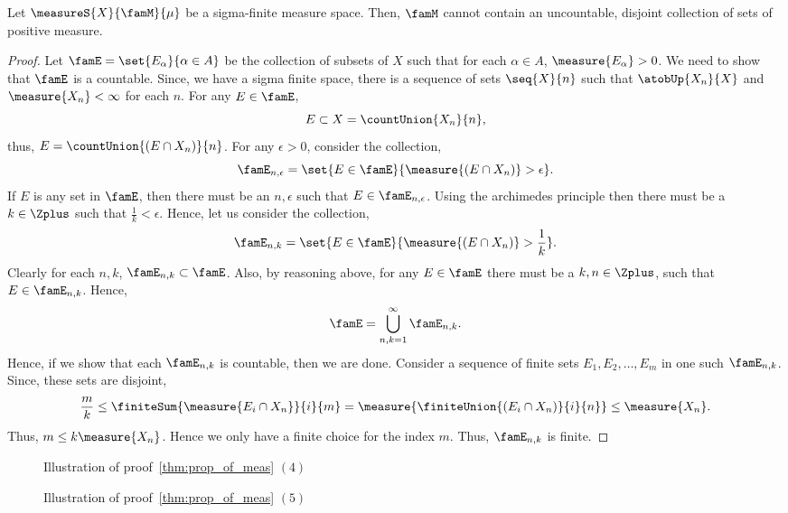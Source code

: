 \begin{Theorem}
    Let $\measureS{X}{\famM}{\mu}$ be a sigma-finite measure space. Then, $\famM$ cannot contain an
    uncountable, disjoint collection of sets of positive measure.
\end{Theorem}
\begin{proof}
    Let $\famE = \set{E_{\alpha}}{\alpha \in A}$ be the collection of subsets of $X$ such that for each
    $\alpha \in A$, $\measure{E_{\alpha}} > 0$. We need to show that $\famE$ is a countable. Since, we have a
    sigma finite space, there is a sequence of sets $\seq{X}{n}$ such that $\atobUp{X_n}{X}$ and 
    $\measure{X_n} < \infty$ for each $n$. For any $E \in \famE$,
    \[E \subset X = \countUnion{X_n}{n},\]
    thus, $E = \countUnion{(E\cap X_n)}{n}$.
    For any $\epsilon > 0$, consider the collection,
    \[\famE_{n,\epsilon} = \set{E \in \famE}{\measure{(E\cap X_n)} > \epsilon}.\]
    If $E$ is any set in $\famE$, then there must be an $n,\epsilon$ such that $E \in \famE_{n,\epsilon}$.
    Using the archimedes principle then there must be a $k \in \Zplus$ such that $\frac{1}{k}< \epsilon$.
    Hence, let us consider the collection,
    \[\famE_{n,k} = \set{E \in \famE}{\measure{(E\cap X_n)} > \frac{1}{k}}.\]
    Clearly for each $n,k$, $\famE_{n,k} \subset \famE$. Also, by reasoning above, for any $E \in \famE$ there
    must be a $k,n \in \Zplus$, such that $E \in \famE_{n,k}$. Hence,
    \[\famE = \bigcup\limits_{n,k = 1}^{\infty}\famE_{n,k}.\]
    Hence, if we show that each $\famE_{n,k}$ is countable, then we are done.
    Consider a sequence of finite sets $E_1, E_2, \dots, E_m$ in one such $\famE_{n,k}$. Since, these sets are
    disjoint,
    \[\frac{m}{k} \leq \finiteSum{\measure{E_i\cap X_n}}{i}{m} = \measure{\finiteUnion{(E_i\cap X_n)}{i}{n}}
	\leq \measure{X_n}.\]
    Thus, $m \leq k\measure{X_n}$. Hence we only have a finite choice for the index $m$. Thus, $\famE_{n,k}$
    is finite.
\end{proof}

\begin{figure}
    
    \caption{Illustration of proof~\ref{thm:prop_of_meas} $(4)$}\label{fig:tikz:measure_prop}
\end{figure}
\begin{figure}
    
    \caption{Illustration of proof~\ref{thm:prop_of_meas} $(5)$}\label{fig:tikz:measure_prop2}
\end{figure}


